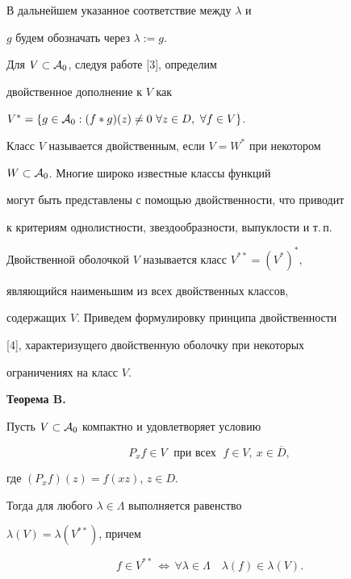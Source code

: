 \medskip





В дальнейшем указанное соответствие между $\lambda$ и


$g$ будем обозначать через $\lambda := g$.





Для $V \subset {\cal A}_0$, следуя работе [3], определим


двойственное дополнение к $V$ как


$V^* = \{ g \in {\cal A}_0: (f*g)(z) \neq 0


\ \forall z \in D,\ \forall f \in V \}$.


Класс $V$ называется двойственным, если $V=W^*$ при некотором


$W \subset {\cal A}_0$. Многие широко известные классы функций


могут быть представлены с помощью двойственности, что приводит


к критериям однолистности, звездообразности, выпуклости и т.\,п.


Двойственной оболочкой $V$ называется класс $V^{**} = (V^* )^*$,


являющийся наименьшим из всех двойственных классов,


содержащих $V$. Приведем формулировку принципа двойственности


[4], характеризущего двойственную оболочку при некоторых


ограничениях на класс $V$.


\medskip





{\bf Теорема B.} {\it


Пусть $V \subset {\cal A}_0$ компактно и удовлетворяет условию


\begin{equation}


P_x f \in V \;\text{ при всех }\; f \in V, \ x \in \overline{D},


\end{equation}


где $(P_x f)(z) = f(xz)$, $z \in D$.


Тогда для любого $\lambda \in \Lambda$ выполняется равенство


$\lambda(V) = \lambda(V^{**})$, причем


\begin{equation}


f \in V^{**} \, \Leftrightarrow \, \forall \lambda \in \Lambda


\quad \lambda(f) \in \lambda(V).


\end{equation}


}





